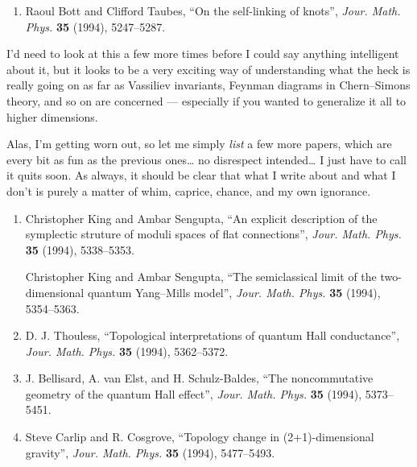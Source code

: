 \documentclass[12pt]{article}
\def\tightlist{}
\begin{document}
\begin{enumerate}
\def\labelenumi{\arabic{enumi})}
\setcounter{enumi}{2}
\tightlist
\item
  Raoul Bott and Clifford Taubes, ``On the self-linking of knots'',
  \emph{Jour. Math. Phys.} \textbf{35} (1994), 5247--5287.
\end{enumerate}
\noindent
I'd need to look at this a few more times before I could say anything
intelligent about it, but it looks to be a very exciting way of
understanding what the heck is really going on as far as Vassiliev
invariants, Feynman diagrams in Chern--Simons theory, and so on are
concerned --- especially if you wanted to generalize it all to higher
dimensions.

Alas, I'm getting worn out, so let me simply \emph{list} a few more
papers, which are every bit as fun as the previous ones\ldots{} no
disrespect intended\ldots{} I just have to call it quits soon. As
always, it should be clear that what I write about and what I don't is
purely a matter of whim, caprice, chance, and my own ignorance.

\begin{enumerate}
\def\labelenumi{\arabic{enumi})}
\setcounter{enumi}{3}
\item
  Christopher King and Ambar Sengupta, ``An explicit description of the
  symplectic struture of moduli spaces of flat connections'',
  \emph{Jour. Math. Phys.} \textbf{35} (1994), 5338--5353.

  Christopher King and Ambar Sengupta, ``The semiclassical limit of the
  two-dimensional quantum Yang--Mills model'', \emph{Jour. Math. Phys.}
  \textbf{35} (1994), 5354--5363.
\item
  D. J. Thouless, ``Topological interpretations of quantum Hall
  conductance'', \emph{Jour. Math. Phys.} \textbf{35} (1994),
  5362--5372.
\item
  J. Bellisard, A. van Elst, and H. Schulz-Baldes, ``The noncommutative
  geometry of the quantum Hall effect'', \emph{Jour. Math. Phys.}
  \textbf{35} (1994), 5373--5451.
\item
  Steve Carlip and R. Cosgrove, ``Topology change in (2+1)-dimensional
  gravity'', \emph{Jour. Math. Phys.} \textbf{35} (1994), 5477--5493.
\end{enumerate}
\end{document}
